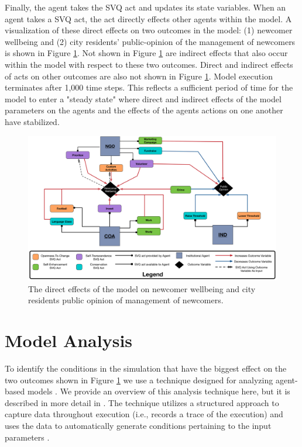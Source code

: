 \documentclass{scspaperproc}
\theoremstyle{scsthe}
\begin{document}
Finally, the agent takes the SVQ act and updates its state variables. When an agent takes a SVQ act, the act directly effects other agents within the model. A visualization of these direct effects on two outcomes in the model: (1) newcomer wellbeing and (2) city residents' public-opinion of the management of newcomers is shown in Figure \ref{fig:model-dynamics}. Not shown in Figure \ref{fig:model-dynamics} are indirect effects that also occur within the model with respect to these two outcomes. Direct and indirect effects of acts on other outcomes are also not shown in Figure \ref{fig:model-dynamics}. Model execution terminates after 1,000 time steps. This reflects a sufficient period of time for the model to enter a "steady state" where direct and indirect effects of the model parameters on the agents and the effects of the agents actions on one another have stabilized.

\begin{figure}[htb]
{
\centering
\includegraphics[width=0.75\columnwidth]{Newcomer-Wellbeing-Causal.png}
\caption{The direct effects of the model on newcomer wellbeing and city residents public opinion of management of newcomers.}
\label{fig:model-dynamics}
}
\end{figure}

\section{Model Analysis}
To identify the conditions in the simulation that have the biggest effect on the two outcomes shown in Figure \ref{fig:model-dynamics} we use a technique designed for analyzing agent-based models \cite{gore2017applying}. We provide an overview of this analysis technique here, but it is described in more detail in \cite{gore2015statistical}. The technique utilizes a structured approach to capture data throughout execution (i.e., records a trace of the execution) and uses the data to automatically generate conditions pertaining to the input parameters \cite{gore2017augmenting}. 
\end{document}
